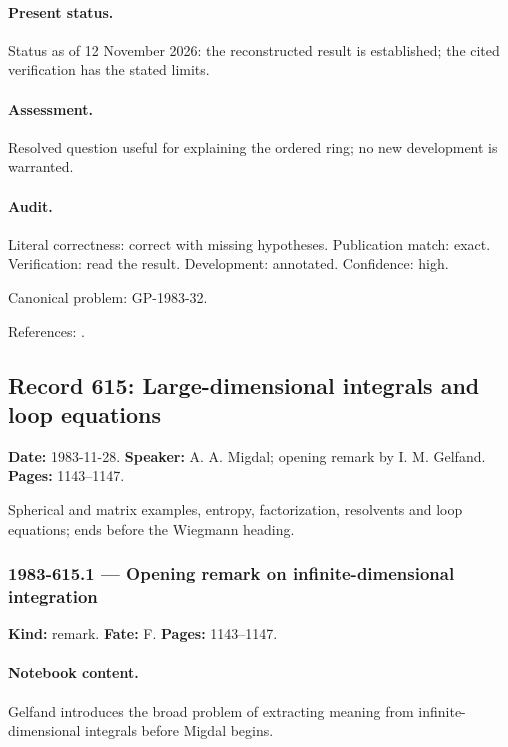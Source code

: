 \paragraph{Present status.} Status as of 12 November 2026: the reconstructed result is established; the cited verification has the stated limits.

\paragraph{Assessment.} Resolved question useful for explaining the ordered ring; no new development is warranted.

\paragraph{Audit.} Literal correctness: correct with missing hypotheses. Publication match: exact. Verification: read the result. Development: annotated. Confidence: high.

\noindent Canonical problem: GP-1983-32.\par

\noindent References: \citep{vershikkerov1983kfunctor}.\par

\subsection{Record 615: Large-dimensional integrals and loop equations}

\label{talk:615}

\noindent\textbf{Date:} 1983-11-28. \textbf{Speaker:} A. A. Migdal; opening remark by I. M. Gelfand. \textbf{Pages:} 1143--1147.\par

Spherical and matrix examples, entropy, factorization, resolvents and loop equations; ends before the Wiegmann heading.

\subsubsection{1983-615.1 --- Opening remark on infinite-dimensional integration}

\label{item:1983-615.1}

\noindent\textbf{Kind:} remark. \textbf{Fate:} F. \textbf{Pages:} 1143--1147.\par

\paragraph{Notebook content.} Gelfand introduces the broad problem of extracting meaning from infinite-dimensional integrals before Migdal begins.

